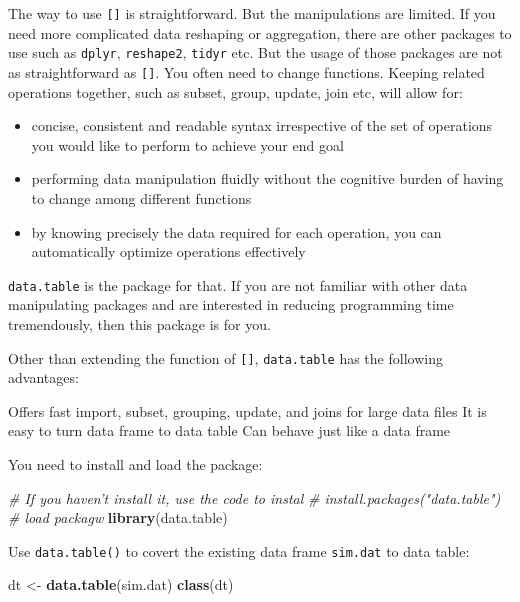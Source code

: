 \documentclass[12pt,]{krantz}
\makeatletter
\newenvironment{Shaded}{\begin{snugshade}}{\end{snugshade}}
\newcommand{\KeywordTok}[1]{\textcolor[rgb]{0.27,0.27,0.27}{\textbf{#1}}}
\newcommand{\StringTok}[1]{\textcolor[rgb]{0.5,0.5,0.5}{#1}}
\newcommand{\CommentTok}[1]{\textcolor[rgb]{0.37,0.37,0.37}{\textit{#1}}}
\newcommand{\NormalTok}[1]{#1}
\providecommand{\tightlist}{%
  \setlength{\itemsep}{0pt}\setlength{\parskip}{0pt}}
\newenvironment{kframe}{%
\medskip{}
\setlength{\fboxsep}{.8em}
 \def\at@end@of@kframe{}%
 \ifinner\ifhmode%
  \def\at@end@of@kframe{\end{minipage}}%
  \begin{minipage}{\columnwidth}%
 \fi\fi%
 \def\FrameCommand##1{\hskip\@totalleftmargin \hskip-\fboxsep
 \colorbox{shadecolor}{##1}\hskip-\fboxsep
     \hskip-\linewidth \hskip-\@totalleftmargin \hskip\columnwidth}%
 \MakeFramed {\advance\hsize-\width
   \@totalleftmargin\z@ \linewidth\hsize
   \@setminipage}}%
 {\par\unskip\endMakeFramed%
 \at@end@of@kframe}
\renewenvironment{Shaded}{\begin{kframe}}{\end{kframe}}
\theoremstyle{definition}
\theoremstyle{definition}
\theoremstyle{definition}
\theoremstyle{remark}
\makeatother
\begin{document}
The way to use \texttt{{[}{]}} is straightforward. But the manipulations
are limited. If you need more complicated data reshaping or aggregation,
there are other packages to use such as \texttt{dplyr},
\texttt{reshape2}, \texttt{tidyr} etc. But the usage of those packages
are not as straightforward as \texttt{{[}{]}}. You often need to change
functions. Keeping related operations together, such as subset, group,
update, join etc, will allow for:

\begin{itemize}
\tightlist
\item
  concise, consistent and readable syntax irrespective of the set of
  operations you would like to perform to achieve your end goal
\item
  performing data manipulation fluidly without the cognitive burden of
  having to change among different functions
\item
  by knowing precisely the data required for each operation, you can
  automatically optimize operations effectively
\end{itemize}

\texttt{data.table} is the package for that. If you are not familiar
with other data manipulating packages and are interested in reducing
programming time tremendously, then this package is for you.

Other than extending the function of \texttt{{[}{]}},
\texttt{data.table} has the following advantages:

Offers fast import, subset, grouping, update, and joins for large data
files It is easy to turn data frame to data table Can behave just like a
data frame

You need to install and load the package:

\begin{Shaded}
\begin{Highlighting}[]
\CommentTok{# If you haven't install it, use the code to instal}
\CommentTok{# install.packages("data.table")}
\CommentTok{# load packagw}
\KeywordTok{library}\NormalTok{(data.table)}
\end{Highlighting}
\end{Shaded}

Use \texttt{data.table()} to covert the existing data frame
\texttt{sim.dat} to data table:

\begin{Shaded}
\begin{Highlighting}[]
\NormalTok{dt <-}\StringTok{ }\KeywordTok{data.table}\NormalTok{(sim.dat)}
\KeywordTok{class}\NormalTok{(dt)}
\end{Highlighting}
\end{Shaded}
\end{document}

